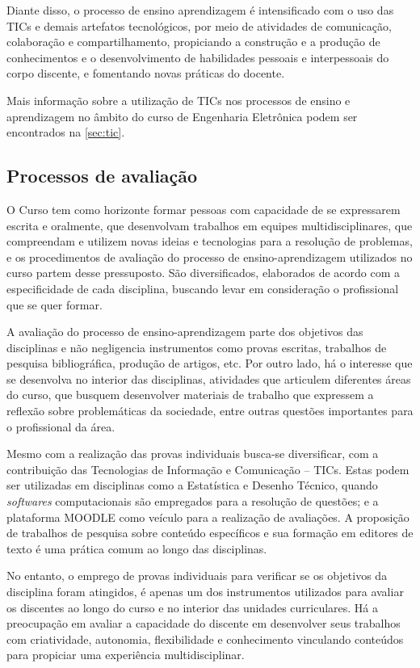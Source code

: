 Diante disso, o processo de ensino aprendizagem é intensificado com o uso das TICs e demais artefatos tecnológicos, por meio de atividades de comunicação, colaboração e compartilhamento, propiciando a construção e a produção de conhecimentos e o desenvolvimento de habilidades pessoais e interpessoais do corpo discente, e fomentando novas práticas do docente.

Mais informação sobre a utilização de TICs nos processos de ensino e aprendizagem no âmbito do curso de Engenharia Eletrônica podem ser encontrados na \autoref{sec:tic}.

\subsection{Processos de avaliação}

O Curso tem como horizonte formar pessoas com capacidade de se expressarem escrita e oralmente, que desenvolvam trabalhos em equipes multidisciplinares, que compreendam e utilizem novas ideias e tecnologias para a resolução de problemas, e os procedimentos de avaliação do processo de ensino-aprendizagem utilizados no curso partem desse pressuposto. São diversificados, elaborados de acordo com a especificidade de cada disciplina, buscando levar em consideração o profissional que se quer formar.

A avaliação do processo de ensino-aprendizagem parte dos objetivos das disciplinas e não negligencia instrumentos como provas escritas, trabalhos de pesquisa bibliográfica, produção de artigos, etc. Por outro lado, há o interesse que se desenvolva no interior das disciplinas, atividades que articulem diferentes áreas do curso, que busquem desenvolver materiais de trabalho que expressem a reflexão sobre problemáticas da sociedade, entre outras questões importantes para o profissional da área.

Mesmo com a realização das provas individuais busca-se diversificar, com a contribuição das Tecnologias de Informação e Comunicação – TICs. Estas podem ser utilizadas em disciplinas como a Estatística e Desenho Técnico, quando \textit{softwares} computacionais são empregados para a resolução de questões; e a plataforma MOODLE como veículo para a realização de avaliações. A proposição de trabalhos de pesquisa sobre conteúdo específicos e sua formação em editores de texto é uma prática comum ao longo das disciplinas.

No entanto, o emprego de provas individuais para verificar se os objetivos da disciplina foram atingidos, é apenas um dos instrumentos utilizados para avaliar os discentes ao longo do curso e no interior das unidades curriculares. Há a preocupação em avaliar a capacidade do discente em desenvolver seus trabalhos com criatividade, autonomia, flexibilidade e conhecimento vinculando conteúdos para propiciar uma experiência multidisciplinar. 

